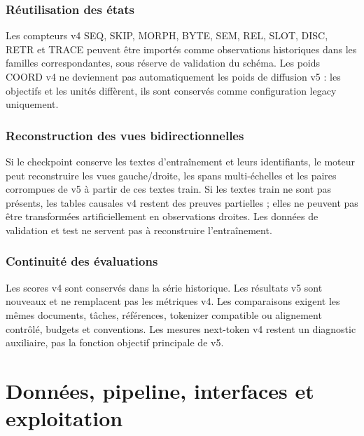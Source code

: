 \documentclass[11pt,a4paper,oneside]{report}
\begin{document}
\section{Réutilisation des états}
Les compteurs v4 SEQ, SKIP, MORPH, BYTE, SEM, REL, SLOT, DISC, RETR et TRACE peuvent être importés comme observations historiques dans les familles correspondantes, sous réserve de validation du schéma. Les poids COORD v4 ne deviennent pas automatiquement les poids de diffusion v5 : les objectifs et les unités diffèrent, ils sont conservés comme configuration legacy uniquement.

\section{Reconstruction des vues bidirectionnelles}
Si le checkpoint conserve les textes d'entraînement et leurs identifiants, le moteur peut reconstruire les vues gauche/droite, les spans multi-échelles et les paires corrompues de v5 à partir de ces textes train. Si les textes train ne sont pas présents, les tables causales v4 restent des preuves partielles ; elles ne peuvent pas être transformées artificiellement en observations droites. Les données de validation et test ne servent pas à reconstruire l'entraînement.

\section{Continuité des évaluations}
Les scores v4 sont conservés dans la série historique. Les résultats v5 sont nouveaux et ne remplacent pas les métriques v4. Les comparaisons exigent les mêmes documents, tâches, références, tokenizer compatible ou alignement contrôlé, budgets et conventions. Les mesures next-token v4 restent un diagnostic auxiliaire, pas la fonction objectif principale de v5.

\part{Données, pipeline, interfaces et exploitation}
\end{document}
